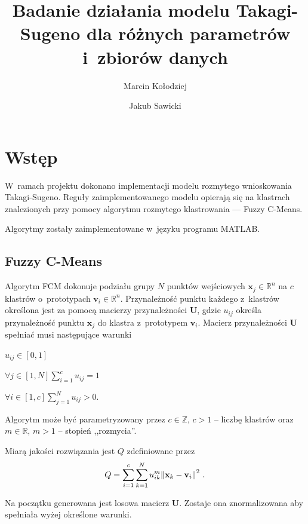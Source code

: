 \documentclass[a4paper; 11pt]{article}
\title{Badanie działania modelu Takagi-Sugeno dla różnych parametrów i~zbiorów danych}
\author{Marcin Kołodziej \and Jakub Sawicki}
\begin{document}
\renewcommand{\figurename}{Rys.}
\renewcommand{\tablename}{Tab.}
\renewcommand{\abstractname}{Abstrakt}

\maketitle

\section{Wstęp}

W~ramach projektu dokonano implementacji modelu rozmytego wnioskowania Takagi-Sugeno.
Reguły zaimplementowanego modelu opierają się na klastrach znalezionych przy
pomocy algorytmu rozmytego klastrowania --- Fuzzy C-Means.

Algorytmy zostały zaimplementowane w~języku programu MATLAB\@.

\subsection{Fuzzy C-Means}

Algorytm FCM dokonuje podziału grupy $N$ punktów wejściowych
$\mathbf{x}_j \in \mathbb{R}^n$ na $c$ klastrów o~prototypach
$\mathbf{v}_i \in \mathbb{R}^n$.
Przynależność punktu każdego z~klastrów określona jest za pomocą macierzy
przynależności $\mathbf{U}$, gdzie $u_{ij}$ określa przynależność punktu
$\mathbf{x}_j$ do klastra z~prototypem $\mathbf{v}_i$.
Macierz przynależności $\mathbf{U}$ spełniać musi następujące warunki
\begin{inparaenum}[ a)]
    \item $u_{ij} \in [0, 1]$
    \item $\forall{j \in [1, N]} \sum_{i=1}^c{u_{ij}} = 1$
    \item $\forall{i \in [1, c]} \sum_{j=1}^N{u_{ij}} > 0$.
\end{inparaenum}

Algorytm może być parametryzowany przez 
$c \in \mathbb{Z}$, $c > 1$ -- liczbę klastrów oraz 
$m \in \mathbb{R}$, $m > 1$ -- stopień ,,rozmycia''.

Miarą jakości rozwiązania jest $Q$ zdefiniowane przez
\begin{equation}
    Q = \sum\limits_{i=1}^c \sum\limits_{k=1}^N {u_{ik}^m \norm{\mathbf{x}_k - \mathbf{v}_i}^2} \text{ .}
    \label{eq:fcm:Q}
\end{equation}

Na początku generowana jest losowa macierz $\mathbf{U}$.
Zostaje ona znormalizowana aby spełniała wyżej określone warunki.
\end{document}
